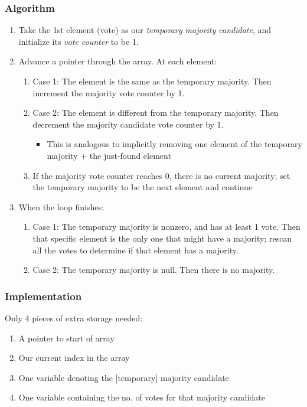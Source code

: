 \documentclass[12pt]{extarticle}
\theoremstyle{definition}
\theoremstyle{remark}
\begin{document}
\subsubsection*{Algorithm}
\begin{enumerate}
    \item Take the 1st element (vote) as our \textit{temporary majority candidate}, and initialize its \textit{vote counter} to be 1.
    \item Advance a pointer through the array. At each element: \begin{enumerate}
        \item Case 1: The element is  the same as the temporary majority. Then increment the majority vote counter by 1.
        \item Case 2: The element is different from the temporary majority. Then decrement the majority candidate vote counter by 1. \begin{itemize}
            \item This is analogous to implicitly removing one element of the temporary majority + the just-found element
        \end{itemize}
        \item If the majority vote counter reaches 0, there is no current majority; set the temporary majority to be the next element and continue
    \end{enumerate}
    \item When the loop finishes: \begin{enumerate}
        \item Case 1: The temporary majority is nonzero, and has at least 1 vote. Then that specific element is the only one that might have a majority; rescan all the votes to determine if that element has a majority.
        \item Case 2: The temporary majority is null. Then there is no majority.
    \end{enumerate}
\end{enumerate}

\subsubsection*{Implementation}
Only 4 pieces of extra storage needed: \begin{enumerate}
    \item A pointer to start of array
    \item Our current index in the array
    \item One variable denoting the [temporary] majority candidate
    \item One variable containing the no. of votes for that majority candidate
\end{enumerate}
\end{document}
